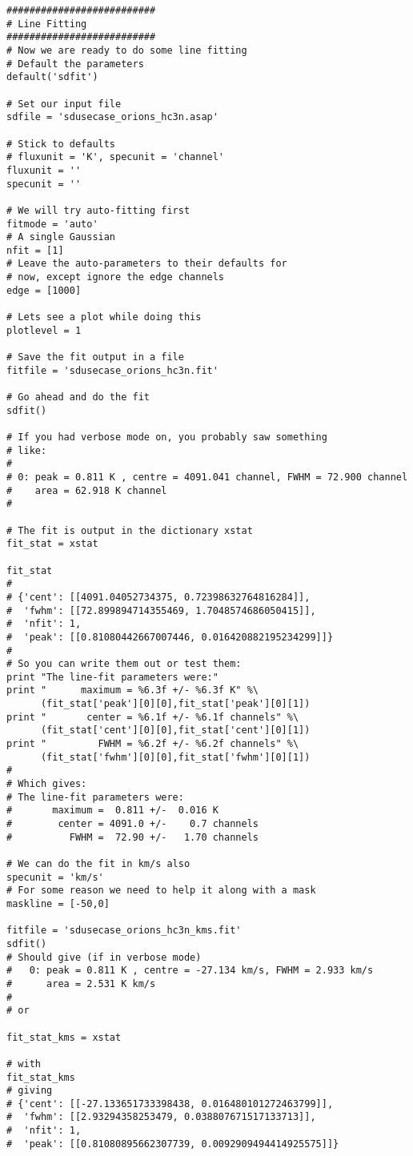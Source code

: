 \begin{verbatim}
##########################
# Line Fitting
##########################
# Now we are ready to do some line fitting
# Default the parameters
default('sdfit')

# Set our input file
sdfile = 'sdusecase_orions_hc3n.asap'

# Stick to defaults
# fluxunit = 'K', specunit = 'channel'
fluxunit = ''
specunit = ''

# We will try auto-fitting first
fitmode = 'auto'
# A single Gaussian
nfit = [1]
# Leave the auto-parameters to their defaults for
# now, except ignore the edge channels
edge = [1000]

# Lets see a plot while doing this
plotlevel = 1

# Save the fit output in a file
fitfile = 'sdusecase_orions_hc3n.fit'

# Go ahead and do the fit
sdfit()

# If you had verbose mode on, you probably saw something
# like:
#
# 0: peak = 0.811 K , centre = 4091.041 channel, FWHM = 72.900 channel
#    area = 62.918 K channel
#

# The fit is output in the dictionary xstat
fit_stat = xstat

fit_stat
#
# {'cent': [[4091.04052734375, 0.72398632764816284]],
#  'fwhm': [[72.899894714355469, 1.7048574686050415]],
#  'nfit': 1,
#  'peak': [[0.81080442667007446, 0.016420882195234299]]}
#
# So you can write them out or test them:
print "The line-fit parameters were:"
print "      maximum = %6.3f +/- %6.3f K" %\
      (fit_stat['peak'][0][0],fit_stat['peak'][0][1])
print "       center = %6.1f +/- %6.1f channels" %\
      (fit_stat['cent'][0][0],fit_stat['cent'][0][1])
print "         FWHM = %6.2f +/- %6.2f channels" %\
      (fit_stat['fwhm'][0][0],fit_stat['fwhm'][0][1])
#
# Which gives:
# The line-fit parameters were:
#       maximum =  0.811 +/-  0.016 K
#        center = 4091.0 +/-    0.7 channels
#          FWHM =  72.90 +/-   1.70 channels

# We can do the fit in km/s also
specunit = 'km/s'
# For some reason we need to help it along with a mask
maskline = [-50,0]

fitfile = 'sdusecase_orions_hc3n_kms.fit'
sdfit()
# Should give (if in verbose mode)
#   0: peak = 0.811 K , centre = -27.134 km/s, FWHM = 2.933 km/s
#      area = 2.531 K km/s
#
# or

fit_stat_kms = xstat

# with
fit_stat_kms
# giving
# {'cent': [[-27.133651733398438, 0.016480101272463799]],
#  'fwhm': [[2.93294358253479, 0.038807671517133713]],
#  'nfit': 1,
#  'peak': [[0.81080895662307739, 0.0092909494414925575]]}



\end{verbatim}
